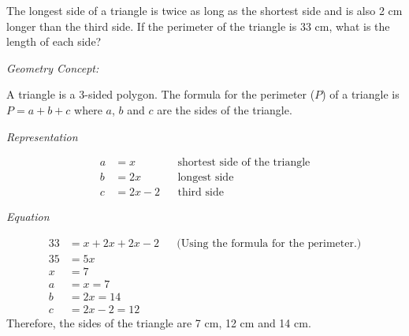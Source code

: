\begin{example}
\Item The longest side of a triangle is twice as long as the shortest side and is also 2 cm longer than the third side. If the perimeter of the triangle is 33 cm, what is the length of each side?

\Solution

\textit{Geometry Concept:}

A triangle is a 3-sided polygon. The formula for the perimeter ($P$) of a triangle is
$P = a + b + c$ where $a$, $b$ and $c$ are the sides of the triangle.


\textit{Representation}

\begin{align*}
a&=x && \text{shortest side of the triangle}\\
b&=2x && \text{longest side}\\
c&=2x-2 && \text{third side}
\end{align*}

\textit{Equation}

\begin{align*}
33 &= x + 2x + 2x - 2 && \text{(Using the formula for the perimeter.)}\\
35 &= 5x\\
x &=7\\
a&=x=7\\
b&= 2x = 14\\
c &= 2x - 2 = 12
\end{align*}
Therefore, the sides of the triangle are 7 cm, 12 cm and 14 cm.
\end{example}

